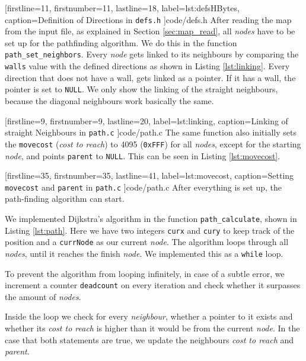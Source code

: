 
[firstline=11,			%
firstnumber=11,			%
lastline=18,			%
label=lst:defsHBytes,	%
caption={Definition of Directions in {\tt defs.h}}
]{code/defs.h}
%
After reading the map from the input file,
as explained in Section \ref{sec:map_read},
all \emph{nodes} have to be set up for the pathfinding algorithm.
We do this in the function {\tt path\_set\_neighbors}.
Every \emph{node} gets linked to its neighbours by comparing the {\tt walls} value
with the defined directions as shown in Listing \ref{lst:linking}.
Every direction that does not have a wall,
gets linked as a pointer.
If it has a wall, the pointer is set to {\tt NULL}.
We only show the linking of the straight neighbours,
because the diagonal neighbours work basically the same.


[firstline=9,			%
firstnumber=9,
lastline=20,			%
label=lst:linking,		%
caption={Linking of straight Neighbours in {\tt path.c}}
]{code/path.c}
%
The same function also initially sets the {\tt movecost}
(\emph{cost to reach}) to 4095 ({\tt 0xFFF}) for all \emph{nodes},
except for the starting \emph{node},
and points {\tt parent} to {\tt NULL}.
This can be seen in Listing \ref{lst:movecost}.


[firstline=35,			%
firstnumber=35,
lastline=41,			%
label=lst:movecost,	%
caption={Setting {\tt movecost} and {\tt parent} in {\tt path.c}}
]{code/path.c}
%
After everything is set up,
the path-finding algorithm can start.

We implemented Dijkstra's algorithm in the function {\tt path\_calculate},
shown in Listing \ref{lst:path}.
Here we have two integers {\tt curx} and {\tt cury} to keep track of the position
and a {\tt currNode} as our current \emph{node}.
The algorithm loops through all \emph{nodes},
until it reaches the finish \emph{node}.
We implemented this as a {\tt while} loop.

To prevent the algorithm from looping infinitely,
in case of a subtle error,
we increment a counter {\tt deadcount} on every iteration
and check whether it surpasses the amount of \emph{nodes}.

Inside the loop we check for every \emph{neighbour},
whether a pointer to it exists
and whether its \emph{cost to reach} is higher than it would be from the current \emph{node}.
In the case that both statements are true,
we update the neighbours \emph{cost to reach}
and \emph{parent}.


